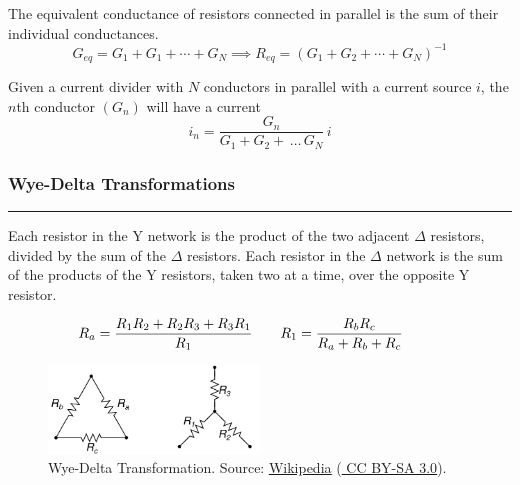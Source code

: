 \documentclass{article}
\begin{document}
    \vspace{.2em}\noindent
    The equivalent conductance of resistors connected in parallel is the sum of their individual conductances.
    \[
        G_{eq} = G_1+G_1+ \cdots + G_N \implies
        R_{eq} = ( G_1+ G_2+ \cdots+G_N )^{-1}
    \]

    \vspace{.2em}\noindent
    Given a current divider with $N$ conductors in parallel with a current source $i$, the $n$th conductor $(G_n)$ will have a current
    \[
        i_n=\frac{G_n}{G_1+G_2+\,\dots\,G_N}\,i
    \]

    \smallskip
    \subsubsection*{Wye-Delta Transformations}
    \vspace{-1em}
    \rule{\linewidth}{0.1mm}

    \noindent
    Each resistor in the Y network is the product of the two adjacent $\Delta$ resistors, divided by the sum of the $\Delta$ resistors.
    Each resistor in the $\Delta$ network is the sum of the products of the Y resistors, taken two at a time, over the opposite Y resistor.

    \vspace{-.5em}
    \[
        \hspace{-2.7em} R_a=\frac{R_1 R_2+R_2 R_3+R_3 R_1}{R_1} \qquad R_1=\frac{R_b R_c}{R_a+R_b+R_c}
    \]
    \vspace{-1em}
    \begin{figure}[htbp]
        \centering
        \includegraphics[width=0.5\textwidth]{wyeDelta}
        \vspace{1em}
        \caption{Wye-Delta Transformation.
        Source:
        \href{https://commons.wikimedia.org/wiki/File:Wye-delta.svg}{\color{blue}\underline{Wikipedia}}
        (\href{https://creativecommons.org/licenses/by-sa/3.0/deed.en}{\color{blue} \underline{CC BY-SA 3.0}}).}

        \label{fig:wye-delta}
    \end{figure}
\end{document}
